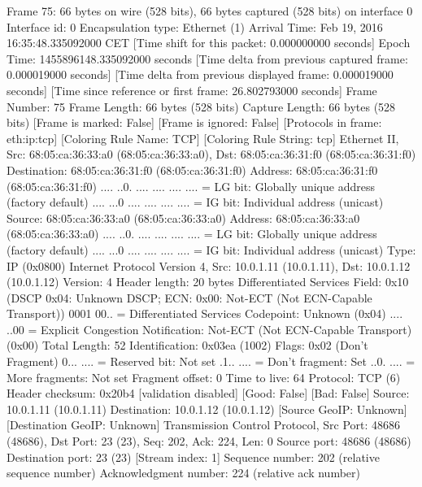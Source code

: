 Frame 75: 66 bytes on wire (528 bits), 66 bytes captured (528 bits) on interface 0
    Interface id: 0
    Encapsulation type: Ethernet (1)
    Arrival Time: Feb 19, 2016 16:35:48.335092000 CET
    [Time shift for this packet: 0.000000000 seconds]
    Epoch Time: 1455896148.335092000 seconds
    [Time delta from previous captured frame: 0.000019000 seconds]
    [Time delta from previous displayed frame: 0.000019000 seconds]
    [Time since reference or first frame: 26.802793000 seconds]
    Frame Number: 75
    Frame Length: 66 bytes (528 bits)
    Capture Length: 66 bytes (528 bits)
    [Frame is marked: False]
    [Frame is ignored: False]
    [Protocols in frame: eth:ip:tcp]
    [Coloring Rule Name: TCP]
    [Coloring Rule String: tcp]
Ethernet II, Src: 68:05:ca:36:33:a0 (68:05:ca:36:33:a0), Dst: 68:05:ca:36:31:f0 (68:05:ca:36:31:f0)
    Destination: 68:05:ca:36:31:f0 (68:05:ca:36:31:f0)
        Address: 68:05:ca:36:31:f0 (68:05:ca:36:31:f0)
        .... ..0. .... .... .... .... = LG bit: Globally unique address (factory default)
        .... ...0 .... .... .... .... = IG bit: Individual address (unicast)
    Source: 68:05:ca:36:33:a0 (68:05:ca:36:33:a0)
        Address: 68:05:ca:36:33:a0 (68:05:ca:36:33:a0)
        .... ..0. .... .... .... .... = LG bit: Globally unique address (factory default)
        .... ...0 .... .... .... .... = IG bit: Individual address (unicast)
    Type: IP (0x0800)
Internet Protocol Version 4, Src: 10.0.1.11 (10.0.1.11), Dst: 10.0.1.12 (10.0.1.12)
    Version: 4
    Header length: 20 bytes
    Differentiated Services Field: 0x10 (DSCP 0x04: Unknown DSCP; ECN: 0x00: Not-ECT (Not ECN-Capable Transport))
        0001 00.. = Differentiated Services Codepoint: Unknown (0x04)
        .... ..00 = Explicit Congestion Notification: Not-ECT (Not ECN-Capable Transport) (0x00)
    Total Length: 52
    Identification: 0x03ea (1002)
    Flags: 0x02 (Don't Fragment)
        0... .... = Reserved bit: Not set
        .1.. .... = Don't fragment: Set
        ..0. .... = More fragments: Not set
    Fragment offset: 0
    Time to live: 64
    Protocol: TCP (6)
    Header checksum: 0x20b4 [validation disabled]
        [Good: False]
        [Bad: False]
    Source: 10.0.1.11 (10.0.1.11)
    Destination: 10.0.1.12 (10.0.1.12)
    [Source GeoIP: Unknown]
    [Destination GeoIP: Unknown]
Transmission Control Protocol, Src Port: 48686 (48686), Dst Port: 23 (23), Seq: 202, Ack: 224, Len: 0
    Source port: 48686 (48686)
    Destination port: 23 (23)
    [Stream index: 1]
    Sequence number: 202    (relative sequence number)
    Acknowledgment number: 224    (relative ack number)
